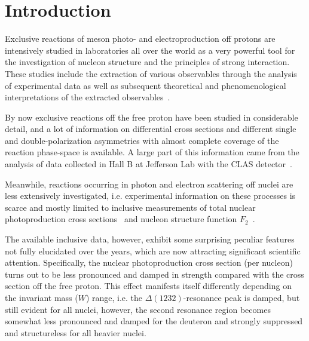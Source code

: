 \chapter{Introduction}
\setcounter{page}{1}
\label{Sect:motiv}

Exclusive reactions of meson photo- and electroproduction off protons are intensively studied in laboratories all over the world as a very powerful tool for the investigation of nucleon structure and the principles of strong interaction. These studies include the extraction of various observables through the analysis of experimental data as well as subsequent theoretical and phenomenological interpretations of the extracted observables~\cite{Krusche:2003ik,Aznauryan:2011qj,Skorodumina:2016pnb}.


By now exclusive reactions off the free proton have been studied in considerable detail, and a lot of information on differential cross sections and different single and double-polarization asymmetries with almost complete coverage of the reaction phase-space is available. A large part of this information came from the analysis of data collected in Hall B at Jefferson Lab with the CLAS detector~\cite{Mecking:2003zu,CLAS_DB}.%


Meanwhile, reactions occurring in photon and electron scattering off nuclei are less extensively investigated, i.e. experimental information on these processes is scarce and mostly limited to inclusive measurements of total nuclear photoproduction cross sections~\cite{Mokeev:1995fy,Bianchi:1994ax,Ahrens:1986hn} and nucleon structure function $F_{2}$~\cite{Osipenko_2005_note,Osipenko:2005gt,Osipenko:2010sb}. 

The available inclusive data, however, exhibit some surprising peculiar features not fully elucidated over the years, which are now attracting significant scientific attention. Specifically, the nuclear photoproduction cross section (per nucleon) turns out to be less pronounced and damped in strength compared with the cross section off the free proton. This effect manifests itself differently depending on the invariant mass ($W$) range, i.e. the $\Delta(1232)$-resonance peak is damped, but still evident for all nuclei, however, the second resonance region becomes somewhat less pronounced and damped for the deuteron and strongly suppressed and structureless for all heavier nuclei. 

